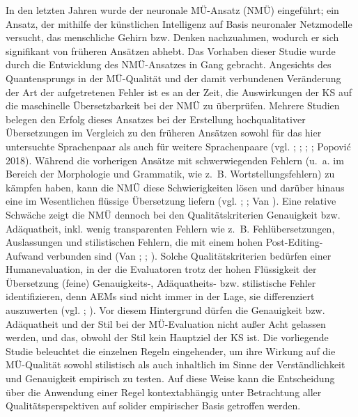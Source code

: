 In den letzten Jahren wurde der neuronale MÜ-Ansatz (NMÜ) eingeführt; ein Ansatz, der mithilfe der künstlichen Intelligenz auf Basis neuronaler Netzmodelle versucht, das menschliche Gehirn bzw. Denken nachzuahmen, wodurch er sich signifikant von früheren Ansätzen abhebt. Das Vorhaben dieser Studie wurde durch die Entwicklung des NMÜ-Ansatzes in Gang gebracht. Angesichts des Quantensprungs in der MÜ-Qualität und der damit verbundenen Veränderung der Art der aufgetretenen Fehler ist es an der Zeit, die Auswirkungen der KS auf die maschinelle Übersetzbarkeit bei der NMÜ zu überprüfen. Mehrere Studien belegen den Erfolg dieses Ansatzes bei der Erstellung hochqualitativer Übersetzungen im Vergleich zu den früheren Ansätzen sowohl für das hier untersuchte Sprachenpaar als auch für weitere Sprachenpaare (vgl. \citealt{BentivogliEtAl2016}; \citealt{WuEtAl2016}; \citealt{CastilhoEtAl2017b}; \citealt{ToralSanchez-Cartagena2017}; Popović 2018). Während die vorherigen Ansätze mit schwerwiegenden Fehlern (u.~a. im Bereich der Morphologie und Grammatik, wie z.~B. Wortstellungsfehlern) zu kämpfen haben, kann die NMÜ diese Schwierigkeiten lösen und darüber hinaus eine im Wesentlichen flüssige Übersetzung liefern (vgl. \citealt{BentivogliEtAl2016}; \citealt{ToralSanchez-Cartagena2017}; Van \citealt{BrusselEtAl2018}). Eine relative Schwäche zeigt die NMÜ dennoch bei den Qualitätskriterien Genauigkeit bzw. Adäquatheit, inkl. wenig transparenten Fehlern wie z.~B. Fehlübersetzungen, Auslassungen und stilistischen Fehlern, die mit einem hohen Post-Editing-Aufwand verbunden sind (Van \citealt{BrusselEtAl2018}; \citealt{Volk2018}; \citealt{VardaroEtAl2019}). Solche Qualitätskriterien bedürfen einer Humanevaluation, in der die Evaluatoren trotz der hohen Flüssigkeit der Übersetzung (feine) Genauigkeits-, Adäquatheits- bzw. stilistische Fehler identifizieren, denn AEMs sind nicht immer in der Lage, sie differenziert auszuwerten (vgl. \citealt{MüllerEtAl2018}; \citealt{ShterionovEtAl2018}). Vor diesem Hintergrund dürfen die Genauigkeit bzw. Adäquatheit und der Stil bei der MÜ-Evaluation nicht außer Acht gelassen werden, und das, obwohl der Stil kein Hauptziel der KS ist. Die vorliegende Studie beleuchtet die einzelnen Regeln eingehender, um ihre Wirkung auf die MÜ-Qualität sowohl stilistisch als auch inhaltlich im Sinne der Verständlichkeit und Genauigkeit empirisch zu testen. Auf diese Weise kann die Entscheidung über die Anwendung einer Regel kontextabhängig unter Betrachtung aller Qualitätsperspektiven auf solider empirischer Basis getroffen werden.

